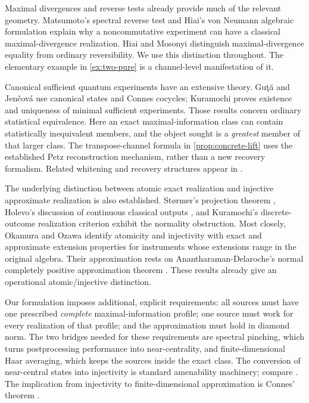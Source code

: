 \documentclass[11pt,reqno]{amsart}
\theoremstyle{definition}
\theoremstyle{remark}
\numberwithin{equation}{section}
\begin{document}
Maximal divergences and reverse tests already provide much of the relevant geometry. Matsumoto's spectral reverse test \cite[Theorem~6.1]{Matsumoto} and Hiai's von Neumann algebraic formulation \cite[Lemma~6.1 and Theorem~6.3]{Hiai} explain why a noncommutative experiment can have a classical maximal-divergence realization. Hiai and Mosonyi \cite[Theorem~3.34 and Example~4.8]{HiaiMosonyi} distinguish maximal-divergence equality from ordinary reversibility. We use this distinction throughout. The elementary example in \cref{ex:two-pure} is a channel-level manifestation of it.

Canonical sufficient quantum experiments have an extensive theory. Gu\c t\u a and Jen\v cov\'a \cite[Corollary~3.4 and Theorem~3.5]{GutaJencova} use canonical states and Connes cocycles; Kuramochi \cite[Theorem~1 and Corollary~2]{KuramochiMinimal} proves existence and uniqueness of minimal sufficient experiments. Those results concern ordinary statistical equivalence. Here an exact maximal-information class can contain statistically inequivalent members, and the object sought is a \emph{greatest} member of that larger class. The transpose-channel formula in \cref{prop:concrete-lift} uses the established Petz reconstruction mechanism, rather than a new recovery formalism. Related whitening and recovery structures appear in \cite[Theorem~5.7]{BSMarkov}.

The underlying distinction between atomic exact realization and injective approximate realization is also established. St\o rmer's projection theorem \cite[p.~47]{Stormer}, Holevo's discussion of continuous classical outputs \cite[\S1]{Holevo}, and Kuramochi's discrete-outcome realization criterion \cite[Lemma~6 and Theorem~5]{KuramochiMinimal} exhibit the normality obstruction. Most closely, Okamura and Ozawa \cite[Theorem~IV.4 and the paragraph following it]{OkamuraOzawa} identify atomicity and injectivity with exact and approximate extension properties for instruments whose extensions range in the original algebra. Their approximation rests on Anantharaman-Delaroche's normal completely positive approximation theorem \cite[Corollary~3.9]{AD}. These results already give an operational atomic/injective distinction.

Our formulation imposes additional, explicit requirements: all sources must have one prescribed \emph{complete} maximal-information profile; one source must work for every realization of that profile; and the approximation must hold in diamond norm. The two bridges needed for these requirements are spectral pinching, which turns postprocessing performance into near-centrality, and finite-dimensional Haar averaging, which keeps the sources inside the exact class. The conversion of near-central states into injectivity is standard amenability machinery; compare \cite[Theorems~3.1.6 and 3.2.2]{Brown}. The implication from injectivity to finite-dimensional approximation is Connes' theorem \cite[Chapter~V, \S7, Theorem~6]{Connes}.
\end{document}
